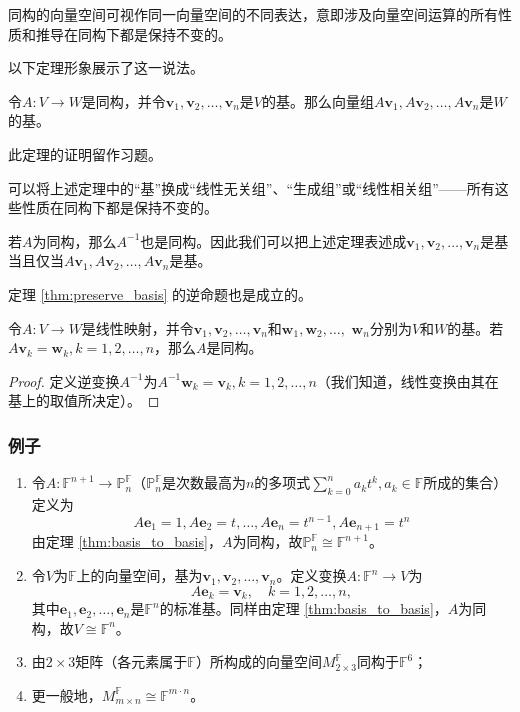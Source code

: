 同构的向量空间可视作同一向量空间的不同表达，意即涉及向量空间运算的所有性质和推导在同构下都是保持不变的。

以下定理形象展示了这一说法。

\begin{theorem}\label{thm:preserve_basis}
    令$A:V\to W$是同构，并令$\mathbf{v}_1,\mathbf{v}_2,\ldots,\mathbf{v}_n$是$V$的基。那么向量组$A\mathbf{v}_{1},A\mathbf{v}_{2},\ldots,A\mathbf{v}_{n}$是$W$的基。
\end{theorem}

此定理的证明留作习题。

\begin{remark*}
    可以将上述定理中的“基”换成“线性无关组”、“生成组”或“线性相关组”——所有这些性质在同构下都是保持不变的。
\end{remark*}

\begin{remark*}
    若$A$为同构，那么$A^{-1}$也是同构。因此我们可以把上述定理表述成$\mathbf{v}_1,\mathbf{v}_2,\ldots,\mathbf{v}_n$是基当且仅当$A\mathbf{v}_{1},A\mathbf{v}_{2},\ldots,A\mathbf{v}_{n}$是基。
\end{remark*}

定理 \ref{thm:preserve_basis} 的逆命题也是成立的。

\begin{theorem}\label{thm:basis_to_basis}
    令$A:V\to W$是线性映射，并令$\mathbf{v}_1,\mathbf{v}_2,\ldots,\mathbf{v}_n$和$\mathbf{w}_1,\mathbf{w}_2,\ldots,$ $\mathbf{w}_n$分别为$V$和$W$的基。若$A\mathbf{v}_{k}=\mathbf{w}_{k},k=1,2,\dots,n$，那么$A$是同构。
\end{theorem}
\begin{proof}
    定义逆变换$A^{-1}$为$A^{-1}\mathbf{w}_{k}=\mathbf{v}_{k},k=1,2,\dots,n$（我们知道，线性变换由其在基上的取值所决定）。
\end{proof}

\subsubsection*{例子}

\begin{enumerate}
    \item 令$A:\mathbb{F}^{n+1}\to\mathbb{P}_{n}^{\mathbb{F}}$（$\mathbb{P}_{n}^{\mathbb{F}}$是次数最高为$n$的多项式$\sum_{k=0}^{n}a_{k}t^{k},a_{k}\in\mathbb{F}$所成的集合）定义为\[A\mathbf{e}_1=1,A\mathbf{e}_2=t,\ldots,A\mathbf{e}_n=t^{n-1},A\mathbf{e}_{n+1}=t^n\]
    由定理 \ref{thm:basis_to_basis}，$A$为同构，故$\mathbb{P}_n^\mathbb{F}\cong\mathbb{F}^{n+1}$。
    \item 令$V$为$\mathbb{F}$上的向量空间，基为$\mathbf{v}_{1},\mathbf{v}_{2},\ldots,\mathbf{v}_{n}$。定义变换$A:\mathbb{F}^{n}\to V$为\[A\mathbf{e}_k=\mathbf{v}_k,\quad k=1,2,\ldots,n,\]
    其中$\mathbf{e}_1,\mathbf{e}_2,\ldots,\mathbf{e}_n$是$\mathbb{F}^n$的标准基。同样由定理 \ref{thm:basis_to_basis}，$A$为同构，故$V\cong\mathbb{F}^{n}$。
    \item 由$2\times 3$矩阵（各元素属于$\mathbb{F}$）所构成的向量空间$M_{2\times3}^{\mathbb{F}}$同构于$\mathbb{F}^6$；
    \item 更一般地，$M_{m\times n}^{\mathbb{F}}\cong\mathbb{F}^{m\cdot n}$。
\end{enumerate}

